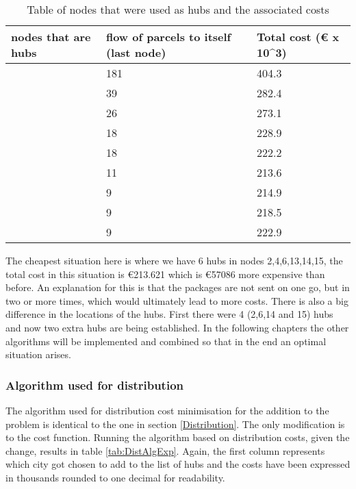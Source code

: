 \documentclass{article}
\begin{document}
            \begin{table}[h!]
            \begin{tabular}{|p{3cm}|p{3cm}|p{3cm}|}
            \hline
            nodes that are hubs & flow of parcels to itself (last node) & Total cost (€ x 10^3) \\
            \hline
            [14] &  181 & 404.3 \\
            \hline
            [14,2]   & 39 & 282.4 \\
            \hline
            [14,2,15] & 26 & 273.1 \\
            \hline
            [14,2,15,6]  & 18 & 228.9 \\
            \hline
            [14,2,15,6,13] & 18 & 222.2\\
            \hline
            [14,2,15,6,13,4] & 11 & 213.6   \\
            \hline
            [14,2,15,6,13,4,3] & 9 & 214.9   \\
            \hline
            [14,2,15,6,13,4,3,9] & 9 & 218.5    \\
            \hline
            [14,2,15,6,13,4,3,9,7] & 9 & 222.9    \\
            \hline
            \end{tabular}
            \caption{Table of nodes that were used as hubs and the associated costs}
            \end{table}

The cheapest situation here is where we have 6 hubs in nodes 2,4,6,13,14,15, the total cost in this situation is €213.621 which is €57086 more expensive than before. An explanation for this is that the packages are not sent on one go, but in two or more times, which would ultimately lead to more costs. There is also a big difference in the locations of the hubs. First there were 4 (2,6,14 and 15) hubs and now two extra hubs are being established. In the following chapters the other algorithms will be implemented and combined so that in the end an optimal situation arises.

\subsubsection{Algorithm used for distribution}
The algorithm used for distribution cost minimisation for the addition to the problem is identical to the one in section \ref{Distribution}. The only modification is to the cost function. Running the algorithm based on distribution costs, given the change, results in table \ref{tab:DistAlgExp}. Again, the first column represents which city got chosen to add to the list of hubs and the costs have been expressed in thousands rounded to one decimal for readability.
\end{document}
